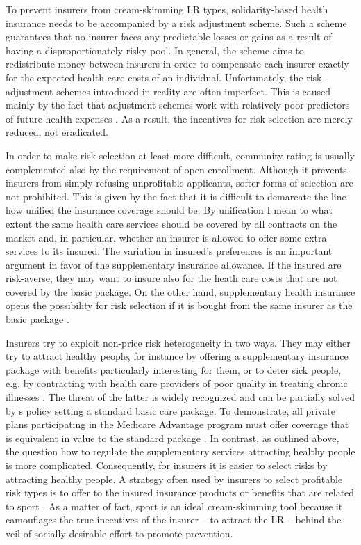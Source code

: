 \documentclass[12pt,english]{article}%
\begin{document}
To prevent insurers from cream-skimming LR types, solidarity-based health insurance needs to be accompanied by a risk adjustment scheme. Such a scheme guarantees that no insurer faces any predictable losses or gains as a result of having a disproportionately risky pool. In general, the scheme aims to redistribute money between insurers in order to compensate each insurer exactly for the expected health care costs of an individual. Unfortunately, the risk-adjustment schemes introduced in reality are often imperfect. This is caused mainly by the fact that adjustment schemes work with relatively poor predictors of future health expenses \citep{ellis2000}. As a result, the incentives for risk selection are merely reduced, not eradicated.

In order to make risk selection at least more difficult, community rating is usually complemented also by the requirement of open enrollment. Although it prevents insurers from simply refusing unprofitable applicants, softer forms of selection are not prohibited. This is given by the fact that it is difficult to demarcate the line how unified the insurance coverage should be. By unification I mean to what extent the same health care services should be covered by all contracts on the market and, in particular, whether an insurer is allowed to offer some extra services to its insured. The variation in insured's preferences is an important argument in favor of the supplementary insurance allowance. If the insured are risk-averse, they may want to insure also for the heath care costs that are not covered by the basic package. On the other hand, supplementary health insurance opens the possibility for risk selection if it is bought from the same insurer as the basic package \citep{paolucci2007}. 

Insurers try to exploit non-price risk heterogeneity in two ways. They may either try to attract healthy people, for instance by offering a supplementary insurance package with benefits particularly interesting for them, or to deter sick people, e.g. by contracting with health care providers of poor quality in treating chronic illnesses \citep{deven2003}. The threat of the latter is widely recognized and can be partially solved by s policy setting a standard basic care package. To demonstrate, all private plans participating in the Medicare Advantage program must offer coverage that is equivalent in value to the standard package \citep{cooper2012}. In contrast, as outlined above, the question how to regulate the supplementary services attracting healthy people is more complicated. Consequently, for insurers it is easier to select risks by attracting healthy people. A strategy often used by insurers to select profitable risk types is to offer to the insured insurance products or benefits that are related to sport \citep{paolucci2007}. As a matter of fact, sport is an ideal cream-skimming tool because it camouflages the true incentives of the insurer -- to attract the LR -- behind the veil of socially desirable effort to promote prevention. 
\end{document}
